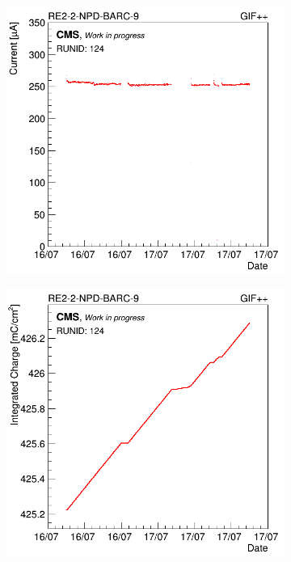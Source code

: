 	\begin{figure}[H]
    	\begin{subfigure}{0.5\linewidth}
			\centering
    		\includegraphics[width = 0.5\plotwidth]{fig/chapt5/GIFpp-Longevity-monitoring.png}
        	\caption{\label{fig:Longevity:A}}
    	\end{subfigure}
    	\begin{subfigure}{0.5\linewidth}
			\centering
    		\includegraphics[width = 0.5\plotwidth]{fig/chapt5/GIFpp-Longevity-int-charge.png}

\end{subfigure}
\end{figure}
